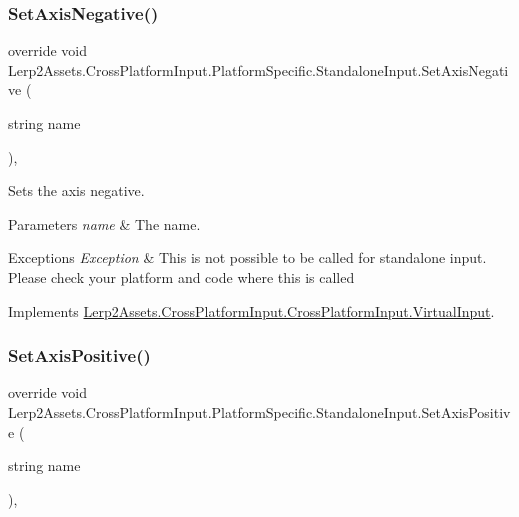 \subsubsection{\texorpdfstring{Set\+Axis\+Negative()}{SetAxisNegative()}}
{\footnotesize\ttfamily override void Lerp2\+Assets.\+Cross\+Platform\+Input.\+Platform\+Specific.\+Standalone\+Input.\+Set\+Axis\+Negative (\begin{DoxyParamCaption}\item[{string}]{name }\end{DoxyParamCaption})\hspace{0.3cm}{\ttfamily [inline]}, {\ttfamily [virtual]}}



Sets the axis negative. 


\begin{DoxyParams}{Parameters}
{\em name} & The name.\\
\hline
\end{DoxyParams}

\begin{DoxyExceptions}{Exceptions}
{\em Exception} & This is not possible to be called for standalone input. Please check your platform and code where this is called\\
\hline
\end{DoxyExceptions}


Implements \hyperlink{class_lerp2_assets_1_1_cross_platform_input_1_1_cross_platform_input_1_1_virtual_input_af420a2c8478dd23fd7ecc2ba035eeb88}{Lerp2\+Assets.\+Cross\+Platform\+Input.\+Cross\+Platform\+Input.\+Virtual\+Input}.

\mbox{\label{class_lerp2_assets_1_1_cross_platform_input_1_1_platform_specific_1_1_standalone_input_a4712f03e0dab60dca4eb97b6d1b82f1b}} 
\subsubsection{\texorpdfstring{Set\+Axis\+Positive()}{SetAxisPositive()}}
{\footnotesize\ttfamily override void Lerp2\+Assets.\+Cross\+Platform\+Input.\+Platform\+Specific.\+Standalone\+Input.\+Set\+Axis\+Positive (\begin{DoxyParamCaption}\item[{string}]{name }\end{DoxyParamCaption})\hspace{0.3cm}{\ttfamily [inline]}, {\ttfamily [virtual]}}



